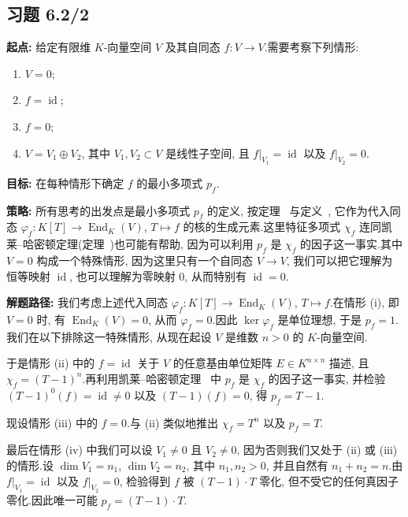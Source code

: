 \subsection*{习题 6.2/2}

\noindent\textbf{起点:} 给定有限维 $K$-向量空间 $V$ 及其自同态 $f \colon V \longrightarrow V$.需要考察下列情形:
\begin{enumerate}
\item[(i)] $V = 0$;
\item[(ii)] $f = \operatorname{id}$;
\item[(iii)] $f = 0$;
\item[(iv)] $V = V_1 \oplus V_2$, 其中 $V_1, V_2 \subset V$ 是线性子空间, 且 $f|_{V_1} = \operatorname{id}$ 以及 $f|_{V_2} = 0$.
\end{enumerate}

\noindent\textbf{目标:} 在每种情形下确定 $f$ 的最小多项式 $p_f$.

\noindent\textbf{策略:} 所有思考的出发点是最小多项式 $p_f$ 的定义, 按定理~ 与定义~, 它作为代入同态 $\varphi_f \colon K[T] \longrightarrow \operatorname{End}_K(V)$, $T \longmapsto f$ 的核的生成元素.这里特征多项式 $\chi_f$ 连同凯莱--哈密顿定理(定理~)也可能有帮助, 因为可以利用 $p_f$ 是 $\chi_f$ 的因子这一事实.其中 $V = 0$ 构成一个特殊情形, 因为这里只有一个自同态 $V \longrightarrow V$, 我们可以把它理解为恒等映射 $\operatorname{id}$, 也可以理解为零映射 $0$, 从而特别有 $\operatorname{id} = 0$.

\noindent\textbf{解题路径:} 我们考虑上述代入同态 $\varphi_f \colon K[T] \longrightarrow \operatorname{End}_K(V)$, $T \longmapsto f$.在情形 (i), 即 $V = 0$ 时, 有 $\operatorname{End}_K(V) = 0$, 从而 $\varphi_f = 0$.因此 $\ker \varphi_f$ 是单位理想, 于是 $p_f = 1$.我们在以下排除这一特殊情形, 从现在起设 $V$ 是维数 $n > 0$ 的 $K$-向量空间.

于是情形 (ii) 中的 $f = \operatorname{id}$ 关于 $V$ 的任意基由单位矩阵 $E \in K^{n \times n}$ 描述, 且 $\chi_f = (T - 1)^n$.再利用凯莱--哈密顿定理~ 中 $p_f$ 是 $\chi_f$ 的因子这一事实, 并检验 $(T - 1)^0(f) = \operatorname{id} \neq 0$ 以及 $(T - 1)(f) = 0$, 得 $p_f = T - 1$.

现设情形 (iii) 中的 $f = 0$.与 (ii) 类似地推出 $\chi_f = T^n$ 以及 $p_f = T$.

最后在情形 (iv) 中我们可以设 $V_1 \neq 0$ 且 $V_2 \neq 0$, 因为否则我们又处于 (ii) 或 (iii) 的情形.设 $\dim V_1 = n_1$, $\dim V_2 = n_2$, 其中 $n_1, n_2 > 0$, 并且自然有 $n_1 + n_2 = n$.由 $f|_{V_1} = \operatorname{id}$ 以及 $f|_{V_2} = 0$, 检验得到 $f$ 被 $(T - 1) \cdot T$ 零化, 但不受它的任何真因子零化.因此唯一可能 $p_f = (T - 1) \cdot T$.

